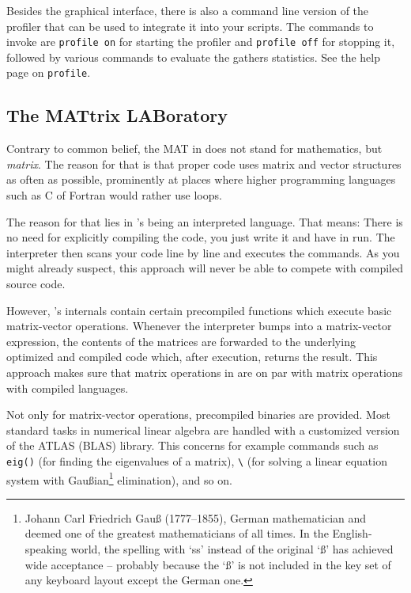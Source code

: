 \begin{remark}
Besides the graphical interface, there is also a command line version of the
profiler that can be used to integrate it into your scripts. The commands to
invoke are \lstinline!profile on! for starting the profiler and
\lstinline!profile off! for stopping it, followed by various commands to
evaluate the gathers statistics. See the \matlab{} help page on
\lstinline!profile!.
\end{remark}


\subsection{The MATtrix LABoratory}

Contrary to common belief, the MAT in \matlab{} does not stand for mathematics,
but \emph{matrix}. The reason for that is that proper \matlab{} code uses
matrix and vector structures as often as possible, prominently at places where
higher programming languages such as C of Fortran would rather use loops.

The reason for that lies in \matlab{}'s being an interpreted language. That
means: There is no need for explicitly compiling the code, you just write it
and have in run. The \matlab{} interpreter then scans your code line by line
and executes the commands. As you might already suspect, this approach will
never be able to compete with compiled source code.

However, \matlab{}'s internals contain certain precompiled functions which
execute basic matrix-vector operations. Whenever the \matlab{} interpreter
bumps into a matrix-vector expression, the contents of the matrices are
forwarded to the underlying optimized and compiled code which, after
execution, returns the result. This approach makes sure that matrix operations
in \matlab{} are on par with matrix operations with compiled languages.

\begin{remark}
Not only for matrix-vector operations, precompiled binaries are provided. Most
standard tasks in numerical linear algebra are handled with a customized
version of the ATLAS (BLAS) library. This concerns for example commands such
as \lstinline!eig()! (for finding the eigenvalues of a matrix), \lstinline!\!
(for solving a linear equation system with Gau{\ss}ian\footnote{Johann Carl
Friedrich Gau{\ss} (1777--1855), German mathematician and deemed one of the
greatest mathematicians of all times. In the English-speaking world, the
spelling with `ss' instead of the original `\ss' has achieved wide acceptance
-- probably because the `\ss' is not included in the key set of any keyboard
layout except the German one.} elimination), and so on.
\end{remark}

